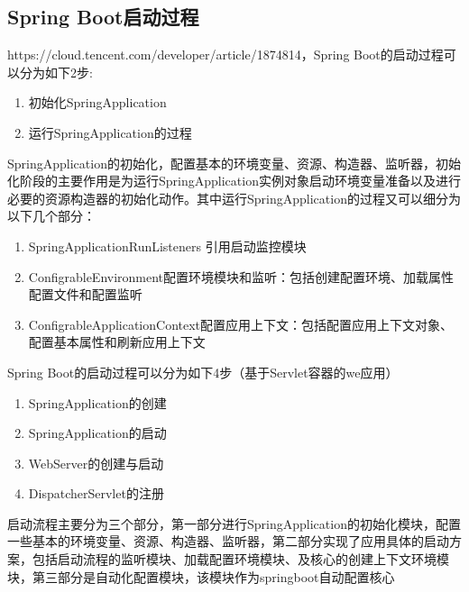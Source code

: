 \documentclass[../../../interview-questions.tex]{subfiles}
\begin{document}
\subsection{Spring Boot启动过程}

https://cloud.tencent.com/developer/article/1874814，Spring Boot的启动过程可以分为如下2步:

\begin{enumerate}
    \item {初始化SpringApplication}
    \item {运行SpringApplication的过程}
\end{enumerate}

SpringApplication的初始化，配置基本的环境变量、资源、构造器、监听器，初始化阶段的主要作用是为运行SpringApplication实例对象启动环境变量准备以及进行必要的资源构造器的初始化动作。其中运行SpringApplication的过程又可以细分为以下几个部分：

\begin{enumerate}
    \item {SpringApplicationRunListeners 引用启动监控模块}
    \item {ConfigrableEnvironment配置环境模块和监听：包括创建配置环境、加载属性配置文件和配置监听}
    \item {ConfigrableApplicationContext配置应用上下文：包括配置应用上下文对象、配置基本属性和刷新应用上下文}
\end{enumerate}

Spring Boot的启动过程可以分为如下4步（基于Servlet容器的we应用）

\begin{enumerate}
    \item {SpringApplication的创建}
    \item {SpringApplication的启动}
    \item {WebServer的创建与启动}
    \item {DispatcherServlet的注册}
\end{enumerate}

启动流程主要分为三个部分，第一部分进行SpringApplication的初始化模块，配置一些基本的环境变量、资源、构造器、监听器，第二部分实现了应用具体的启动方案，包括启动流程的监听模块、加载配置环境模块、及核心的创建上下文环境模块，第三部分是自动化配置模块，该模块作为springboot自动配置核心
\end{document}
